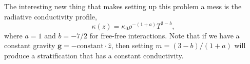 \documentclass[aps, pre, onecolumn, nofootinbib, notitlepage, groupedaddress, amsfonts, amssymb, amsmath, longbibliography]{revtex4-1}
\begin{document}
The interesting new thing that makes setting up this problem a mess is the 
radiative conductivity profile,
\begin{equation}
\kappa(z) = \kappa_0 \rho^{-(1+a)}T^{3-b},
\end{equation}
where $a = 1$ and $b = -7/2$ for free-free interactions. Note that if we have
a constant gravity $\bm{g} = -\text{constant}\cdot\hat{z}$, then setting
$m = (3 - b) / (1 + a)$ will produce a stratification that has a constant
conductivity.



\end{document}
